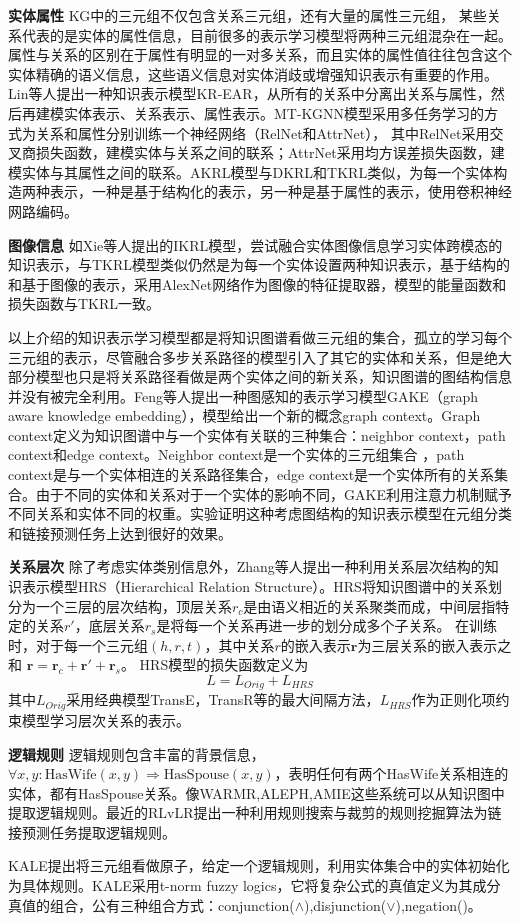 \documentclass[twocolumn]{article}
\newcommand{\upcite}[1]{\textsuperscript{\textsuperscript{\cite{#1}}}}
\begin{document}
\noindent\textbf{实体属性} \quad 
KG中的三元组不仅包含关系三元组，还有大量的属性三元组，
某些关系代表的是实体的属性信息，目前很多的表示学习模型将两种三元组混杂在一起。属性与关系的区别在于属性有明显的一对多关系，而且实体的属性值往往包含这个实体精确的语义信息，这些语义信息对实体消歧或增强知识表示有重要的作用。
Lin等人\upcite{EAR}提出一种知识表示模型KR-EAR，从所有的关系中分离出关系与属性，然后再建模实体表示、关系表示、属性表示。MT-KGNN\upcite{MTKGNN}模型采用多任务学习的方式为关系和属性分别训练一个神经网络（RelNet和AttrNet），
其中RelNet采用交叉商损失函数，建模实体与关系之间的联系；AttrNet采用均方误差损失函数，建模实体与其属性之间的联系。AKRL\upcite{AKRL}模型与DKRL和TKRL类似，为每一个实体构造两种表示，一种是基于结构化的表示，另一种是基于属性的表示，使用卷积神经网路编码。

\noindent\textbf{图像信息} \quad
如Xie等人\upcite{IKRL}提出的IKRL模型，尝试融合实体图像信息学习实体跨模态的知识表示，与TKRL模型类似仍然是为每一个实体设置两种知识表示，基于结构的和基于图像的表示，采用AlexNet\upcite{Alexnet}网络作为图像的特征提取器，模型的能量函数和损失函数与TKRL一致。

以上介绍的知识表示学习模型都是将知识图谱看做三元组的集合，孤立的学习每个三元组的表示，尽管融合多步关系路径的模型引入了其它的实体和关系，但是绝大部分模型也只是将关系路径看做是两个实体之间的新关系，知识图谱的图结构信息并没有被完全利用。Feng等人\upcite{GAKE}提出一种图感知的表示学习模型GAKE（graph aware knowledge embedding），模型给出一个新的概念graph context。Graph context定义为知识图谱中与一个实体有关联的三种集合：neighbor context，path context和edge context。Neighbor context是一个实体的三元组集合
，path context是与一个实体相连的关系路径集合，edge context是一个实体所有的关系集合。由于不同的实体和关系对于一个实体的影响不同，GAKE利用注意力机制赋予不同关系和实体不同的权重。实验证明这种考虑图结构的知识表示模型在元组分类和链接预测任务上达到很好的效果。

\noindent\textbf{关系层次} \quad
	除了考虑实体类别信息外，Zhang等人\upcite{HRS}提出一种利用关系层次结构的知识表示模型HRS（Hierarchical Relation Structure）。HRS将知识图谱中的关系划分为一个三层的层次结构，顶层关系$r_c$是由语义相近的关系聚类而成，中间层指特定的关系$r'$，底层关系$r_s$是将每一个关系再进一步的划分成多个子关系。
在训练时，对于每一个三元组$(h,r,t)$，其中关系$r$的嵌入表示$\textbf{r}$为三层关系的嵌入表示之和
$\textbf{r}=\textbf{r}_c+\textbf{r}'+\textbf{r}_s$。
HRS模型的损失函数定义为
\begin{equation}
L=L_{Orig}+L_{HRS}
\end{equation}
其中$L_{Orig}$采用经典模型TransE，TransR等的最大间隔方法，$L_{HRS}$作为正则化项约束模型学习层次关系的表示。

\noindent\textbf{逻辑规则} \quad
逻辑规则包含丰富的背景信息，$\forall x,y: \text{HasWife}(x,y) \Rightarrow \text{HasSpouse}(x,y)$，表明任何有两个HasWife关系相连的实体，都有HasSpouse关系。像WARMR,ALEPH,AMIE这些系统可以从知识图中提取逻辑规则。最近的RLvLR提出一种利用规则搜索与裁剪的规则挖掘算法为链接预测任务提取逻辑规则。

KALE提出将三元组看做原子，给定一个逻辑规则，利用实体集合中的实体初始化为具体规则。KALE采用t-norm fuzzy logics，它将复杂公式的真值定义为其成分真值的组合，公有三种组合方式：conjunction($\wedge $),disjunction($\vee$),negation()。
\end{document}
